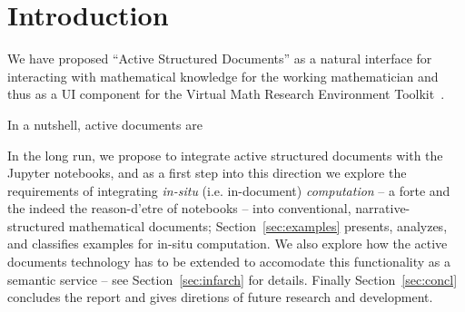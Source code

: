 \section{Introduction}\label{sec:intro}


We have proposed ``Active Structured Documents'' as a natural interface for interacting
with mathematical knowledge for the working mathematician and thus as a UI component for
the \pn Virtual Math Research Environment Toolkit~\cite{ODK-D4.2}.

In a nutshell, active documents are 

In the long run, we propose to integrate active structured documents with the Jupyter
notebooks, and as a first step into this direction we explore the requirements of
integrating \emph{in-situ} (i.e. in-document) \emph{computation} -- a forte and the indeed
the reason-d'etre of notebooks -- into conventional, narrative-structured mathematical
documents; Section~\ref{sec:examples} presents, analyzes, and classifies examples for
in-situ computation.  We also explore how the active documents technology has to be
extended to accomodate this functionality as a semantic service -- see
Section~\ref{sec:infarch} for details. Finally Section~\ref{sec:concl} concludes the report
and gives diretions of future research and development.

